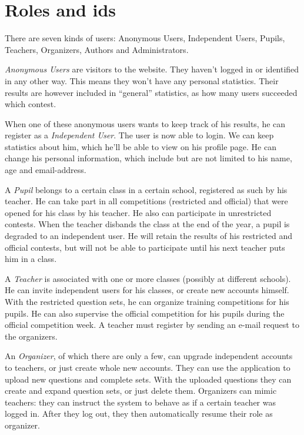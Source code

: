 
\section{Roles and ids}

There are seven kinds of users: Anonymous Users, Independent Users, Pupils,
Teachers, Organizers, Authors and Administrators.

\textit{Anonymous Users} are visitors to the website. They haven't logged in or
identified in any other way. This means they won't have any personal
statistics. Their results are however included in ``general'' statistics, as
how many users succeeded which contest.

When one of these anonymous users wants to keep track of his results, he can
register as a \textit{Independent User}. The user is now able to login. We can
keep statistics about him, which he'll be able to view on his profile page. He
can change his personal information, which include but are not limited to his
name, age and email-address.

A \textit{Pupil} belongs to a certain class in a certain school, registered
as such by his teacher. He can take part in all competitions (restricted and
official) that were opened for his class by his teacher. He also can
participate in unrestricted contests. When the teacher disbands the class at
the end of the year, a pupil is degraded to an independent user. He will
retain the results of his restricted and official contests, but will not be
able to participate until his next teacher puts him in a class.

A \textit{Teacher} is associated with one or more classes (possibly at
different schools). He can invite independent users for his classes, or create
new accounts himself. With the restricted question sets, he can organize
training competitions for his pupils. He can also supervise the official
competition for his pupils during the official competition week. A teacher
must register by sending an e-mail request to the organizers.

An \textit{Organizer}, of which there are only a few, can upgrade independent
accounts to teachers, or just create whole new accounts. They can use the
application to upload new questions and complete sets. With the uploaded
questions they can create and expand question sets, or just delete them.
Organizers can mimic teachers: they can instruct the system to behave as if a
certain teacher was logged in. After they log out, they then automatically
resume their role as organizer.

